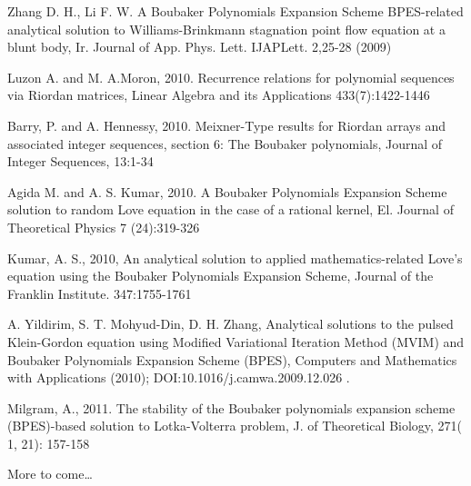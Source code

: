 \documentclass[12pt]{article}
\begin{document}
Zhang D. H., Li F. W. A Boubaker Polynomials Expansion Scheme BPES-related analytical solution to Williams-Brinkmann stagnation point flow equation at a blunt body, Ir. Journal of App. Phys. Lett. IJAPLett. 2,25-28 (2009)

Luzon A. and M. A.Moron, 2010. Recurrence relations for polynomial sequences via Riordan matrices, Linear Algebra and its Applications 433(7):1422-1446

Barry, P. and A. Hennessy, 2010. Meixner-Type results for Riordan arrays and associated integer sequences, section 6: The Boubaker polynomials, Journal of Integer Sequences, 13:1-34

Agida M. and A. S. Kumar, 2010. A Boubaker Polynomials Expansion Scheme solution to random Love equation in the case of a rational kernel, El. Journal of Theoretical Physics 7 (24):319-326

Kumar, A. S., 2010, An analytical solution to applied mathematics-related Love's equation using the Boubaker Polynomials Expansion Scheme, Journal of the Franklin Institute. 347:1755-1761

A. Yildirim, S. T. Mohyud-Din, D. H. Zhang, Analytical solutions to the pulsed Klein-Gordon equation using Modified Variational Iteration Method (MVIM) and Boubaker Polynomials Expansion Scheme (BPES), Computers and Mathematics with Applications (2010); DOI:10.1016/j.camwa.2009.12.026 .

Milgram, A., 2011. The stability of the Boubaker polynomials expansion scheme (BPES)-based solution to Lotka-Volterra problem, J. of Theoretical Biology, 271( 1, 21): 157-158


More to come\dots
\end{document}
